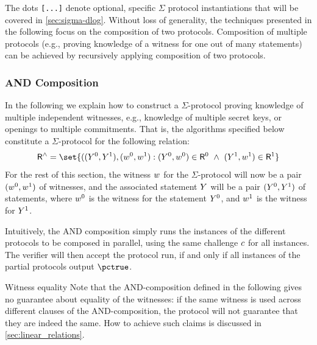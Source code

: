 \documentclass[11pt]{article}
\begin{document}
The dots \texttt{[...]} denote optional, specific $\Sigma$ protocol instantiations that will be covered in \cref{sec:sigma-dlog}.
  Without loss of generality, the techniques presented in the following focus on the composition of two protocols.
  Composition of multiple protocols (e.g., proving knowledge of a witness for one out of many statements) can be achieved by recursively applying composition of two protocols.

  \subsubsection{AND Composition}
  In the following we explain how to construct a $\Sigma$-protocol proving knowledge of multiple independent witnesses, e.g., knowledge of multiple secret keys, or openings to multiple commitments.
  That is, the algorithms specified below constitute a $\Sigma$-protocol for the following relation:
\[
  \relation^\land = \set{
    ((\statement^0,\statement^1),(\witness^0,\witness^1) : (\statement^0,\witness^0)\in \relation^0 ~\land~ (\statement^1,\witness^1)\in\relation^1}
\]
For the rest of this section, the witness $w$ for the $\Sigma$-protocol will now be a pair $(w^0, w^1)$ of witnesses, and the associated statement $Y$ will be a pair $(Y^0, Y^1)$ of statements, where $w^0$ is the witness for the statement $Y^0$, and $w^1$ is the witness for $Y^1$.

  Intuitively, the AND composition simply runs the instances of the different protocols to be composed in parallel, using the same challenge $c$ for all instances.
  The verifier will then accept the protocol run, if and only if all instances of the partial protocols output $\accept$.
  \begin{remark}{Witness equality}{}
  Note that the AND-composition defined in the following gives no guarantee about equality of the witnesses: if the same witness is used across different clauses of the AND-composition, the protocol will not guarantee that they are indeed the same.
	How to achieve such claims is discussed in \cref{sec:linear_relations}.
  \end{remark}
\end{document}
